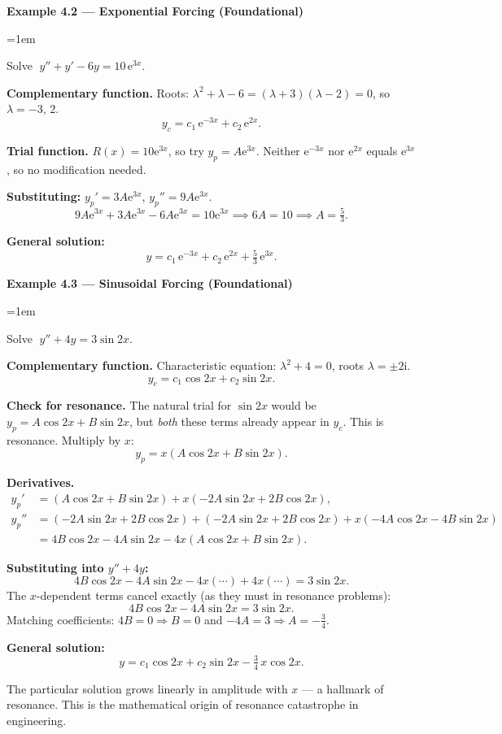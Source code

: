 \documentclass[12pt,a4paper]{article}
\newenvironment{example}[1]{%
  \vspace{0.8em}
  \noindent{\footnotesize\scshape\color{orange!50!black} Example}\par
  \noindent\textbf{#1}\par\vspace{0.3em}
  \begin{list}{}{\leftmargin=1em\rightmargin=0pt}\item
}{%
  \end{list}\vspace{0.8em}
}
\newcommand{\ee}{\mathrm{e}}
\newcommand{\ii}{\mathrm{i}}
\begin{document}

\begin{example}{Example 4.2 --- Exponential Forcing (Foundational)}
Solve $\;y'' + y' - 6y = 10\,\ee^{3x}$.

\medskip
\textbf{Complementary function.}
Roots: $\lambda^2+\lambda-6=(\lambda+3)(\lambda-2)=0$, so $\lambda=-3,\,2$.
\[
  y_c = c_1\,\ee^{-3x} + c_2\,\ee^{2x}.
\]

\textbf{Trial function.} $R(x) = 10\ee^{3x}$, so try $y_p = A\ee^{3x}$.
Neither $\ee^{-3x}$ nor $\ee^{2x}$ equals $\ee^{3x}$, so no modification needed.

\textbf{Substituting:} $y_p'=3A\ee^{3x}$, $y_p''=9A\ee^{3x}$.
\[
  9A\ee^{3x} + 3A\ee^{3x} - 6A\ee^{3x} = 10\ee^{3x}
  \implies 6A = 10 \implies A = \tfrac{5}{3}.
\]

\textbf{General solution:}
\[
  \boxed{y = c_1\,\ee^{-3x} + c_2\,\ee^{2x} + \tfrac{5}{3}\,\ee^{3x}.}
\]
\end{example}


\begin{example}{Example 4.3 --- Sinusoidal Forcing (Foundational)}
Solve $\;y'' + 4y = 3\sin 2x$.

\medskip
\textbf{Complementary function.}
Characteristic equation: $\lambda^2+4=0$, roots $\lambda=\pm 2\ii$.
\[
  y_c = c_1\cos 2x + c_2\sin 2x.
\]

\textbf{Check for resonance.} The natural trial for $\sin 2x$ would be
$y_p = A\cos 2x + B\sin 2x$, but \emph{both} these terms already appear in $y_c$.
This is resonance. Multiply by $x$:
\[
  y_p = x(A\cos 2x + B\sin 2x).
\]

\textbf{Derivatives.}
\begin{align*}
  y_p' &= (A\cos 2x + B\sin 2x) + x(-2A\sin 2x + 2B\cos 2x),\\
  y_p'' &= (-2A\sin 2x + 2B\cos 2x) + (-2A\sin 2x + 2B\cos 2x)
           + x(-4A\cos 2x - 4B\sin 2x)\\
        &= 4B\cos 2x - 4A\sin 2x - 4x(A\cos 2x + B\sin 2x).
\end{align*}

\textbf{Substituting into $y''+4y$:}
\[
  4B\cos 2x - 4A\sin 2x - 4x(\cdots) + 4x(\cdots) = 3\sin 2x.
\]
The $x$-dependent terms cancel exactly (as they must in resonance problems):
\[
  4B\cos 2x - 4A\sin 2x = 3\sin 2x.
\]
Matching coefficients: $4B = 0 \Rightarrow B = 0$ and $-4A = 3 \Rightarrow A = -\tfrac{3}{4}$.

\textbf{General solution:}
\[
  \boxed{y = c_1\cos 2x + c_2\sin 2x - \tfrac{3}{4}\,x\cos 2x.}
\]

The particular solution grows linearly in amplitude with $x$ --- a hallmark of
resonance. This is the mathematical origin of resonance catastrophe in engineering.
\end{example}
\end{document}
